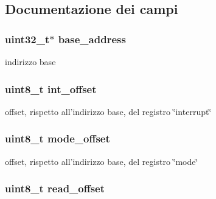 \subsection{Documentazione dei campi}
\hypertarget{structmy_g_p_i_o__t_a79c591d5fa42efdf86abd98347fece90}{
\subsubsection[{base\+\_\+address}]{\setlength{\rightskip}{0pt plus 5cm}uint32\+\_\+t$\ast$ base\+\_\+address}}\label{structmy_g_p_i_o__t_a79c591d5fa42efdf86abd98347fece90}
indirizzo base \hypertarget{structmy_g_p_i_o__t_a85774c49d56d05c7daa0803bf49654c4}{
\subsubsection[{int\+\_\+offset}]{\setlength{\rightskip}{0pt plus 5cm}uint8\+\_\+t int\+\_\+offset}}\label{structmy_g_p_i_o__t_a85774c49d56d05c7daa0803bf49654c4}
offset, rispetto all'indirizzo base, del registro \char`\"{}interrupt\char`\"{} \hypertarget{structmy_g_p_i_o__t_ad21272e5293d7c1e7ccafe35a2e129d1}{
\subsubsection[{mode\+\_\+offset}]{\setlength{\rightskip}{0pt plus 5cm}uint8\+\_\+t mode\+\_\+offset}}\label{structmy_g_p_i_o__t_ad21272e5293d7c1e7ccafe35a2e129d1}
offset, rispetto all'indirizzo base, del registro \char`\"{}mode\char`\"{} \hypertarget{structmy_g_p_i_o__t_ab65acde67dc46f1d163e2ee468420b48}{
\subsubsection[{read\+\_\+offset}]{\setlength{\rightskip}{0pt plus 5cm}uint8\+\_\+t read\+\_\+offset}}\label{structmy_g_p_i_o__t_ab65acde67dc46f1d163e2ee468420b48}
